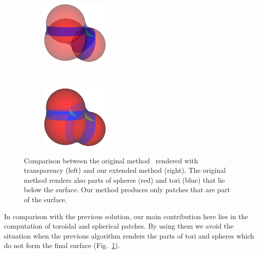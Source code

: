 \begin{figure}[htp]
  \centering
  \begin{subfigure}[t]{0.48\columnwidth}
    \centering
    \includegraphics[width=1.3in]{image/cb-krone.png}
  \end{subfigure}%
  ~
  \begin{subfigure}[t]{0.48\columnwidth}
    \centering
    \includegraphics[width=1.3in]{image/cb-oit.png}
  \end{subfigure}
	
\caption{Comparison between the original method~\cite{krone2011parallel} rendered with transparency (left) and our extended method (right).
The original method renders also parts of spheres (red) and tori (blue) that lie below the surface.
Our method produces only patches that are part of the surface.
}
\label{fig:cb-oit}
\end{figure}

In comparison with the previous solution, our main contribution here lies in the computation of toroidal and spherical patches.
By using them we avoid the situation when the previous algorithm renders the parts of tori and spheres which do not form the final surface (Fig.~\ref{fig:cb-oit}).



